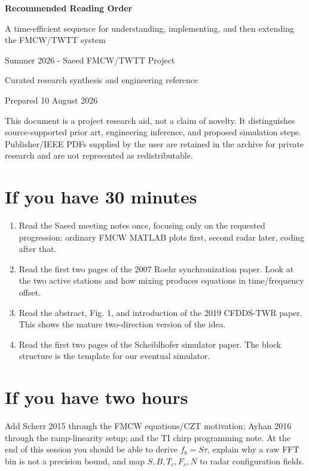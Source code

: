 \documentclass[11pt]{article}
\begin{document}
\begin{titlepage}
\centering
\vspace*{1.2in}
{\Huge\bfseries\color{navy} Recommended Reading Order\par}
\vspace{0.3in}
{\Large A time-efficient sequence for understanding, implementing, and then extending the FMCW/TWTT system\par}
\vspace{0.6in}
{\large Summer 2026 - Saeed FMCW/TWTT Project\par}
\vfill
{\large Curated research synthesis and engineering reference\par}
{\large Prepared 10 August 2026\par}
\vspace{0.4in}
\begin{minipage}{0.82\textwidth}
\small
This document is a project research aid, not a claim of novelty. It distinguishes source-supported prior art, engineering inference, and proposed simulation steps. Publisher/IEEE PDFs supplied by the user are retained in the archive for private research and are not represented as redistributable.
\end{minipage}
\end{titlepage}
\tableofcontents
\clearpage

\section{If you have 30 minutes}
\begin{enumerate}
\item Read the Saeed meeting notes once, focusing only on the requested progression: ordinary FMCW MATLAB plots first, second radar later, coding after that.
\item Read the first two pages of the 2007 Roehr synchronization paper. Look at the two active stations and how mixing produces equations in time/frequency offset.
\item Read the abstract, Fig. 1, and introduction of the 2019 CFDDS-TWR paper. This shows the mature two-direction version of the idea.
\item Read the first two pages of the Scheiblhofer simulator paper. The block structure is the template for our eventual simulator.
\end{enumerate}

\section{If you have two hours}
Add Scherr 2015 through the FMCW equations/CZT motivation; Ayhan 2016 through the ramp-linearity setup; and the TI chirp programming note. At the end of this session you should be able to derive $f_b=S\tau$, explain why a raw FFT bin is not a precision bound, and map $S,B,T_c,F_s,N$ to radar configuration fields.
\end{document}
